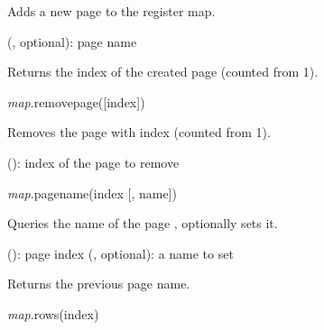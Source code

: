 \documentclass[a4paper,12pt,twoside,extrafontsizes]{memoir}
\begin{document}
\begin{funcdescr}
	Adds a new page to the register map.
\end{funcdescr}

\begin{funcparams}
	 (, optional): page name
\end{funcparams}

\begin{funcret}
	Returns the index of the created page (counted from 1).
\end{funcret}


\begin{luafuncprototype}
\emph{map}.removepage([index])
\end{luafuncprototype}

\begin{funcdescr}
	Removes the page with index  (counted from 1).
\end{funcdescr}

\begin{funcparams}
	 (): index of the page to remove
\end{funcparams}


\begin{luafuncprototype}
\emph{map}.pagename(index [, name])
\end{luafuncprototype}

\begin{funcdescr}
	Queries the name of the page , optionally sets it.
\end{funcdescr}

\begin{funcparams}
	 (): page index
	 (, optional): a name to set
\end{funcparams}

\begin{funcret}
	Returns the previous page name.
\end{funcret}


\begin{luafuncprototype}
\emph{map}.rows(index)
\end{luafuncprototype}
\end{document}
